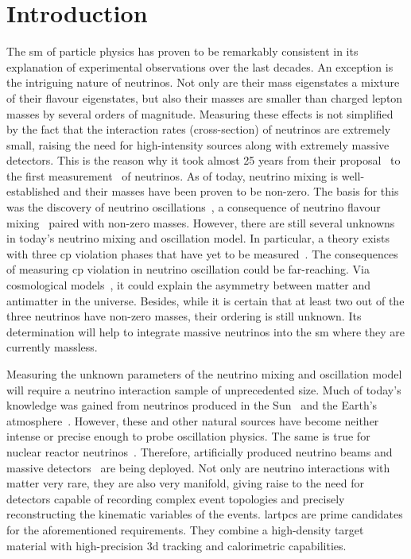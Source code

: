 \chapter{Introduction}
\label{chap:introduction}

The \gls{sm} of particle physics has proven to be remarkably consistent in its explanation of experimental observations over the last decades.
An exception is the intriguing nature of neutrinos.
Not only are their mass eigenstates a mixture of their flavour eigenstates, but also their masses are smaller than charged lepton masses by several orders of magnitude.
Measuring these effects is not simplified by the fact that the interaction rates (cross-section) of neutrinos are extremely small, raising the need for high-intensity sources along with extremely massive detectors.
This is the reason why it took almost \num{25} years from their proposal~\cite{pauliLetter} to the first measurement~\cite{reinesCowan} of neutrinos.
As of today, neutrino mixing is well-established and their masses have been proven to be non-zero.
The basis for this was the discovery of neutrino oscillations~\cite{superKAtmos1, superKAtmos2, snoSolar}, a consequence of neutrino flavour mixing~\cite{pontecorvo, makiNakagawaSakata} paired with non-zero masses.
However, there are still several unknowns in today's neutrino mixing and oscillation model.
In particular, a theory exists with three \gls{cp} violation phases that have yet to be measured~\cite{pontecorvo, makiNakagawaSakata, mariuana}.
The consequences of measuring \gls{cp} violation in neutrino oscillation could be far-reaching.
Via cosmological models~\cite{pdg}, it could explain the asymmetry between matter and antimatter in the universe.
Besides, while it is certain that at least two out of the three neutrinos have non-zero masses, their ordering is still unknown.
Its determination will help to integrate massive neutrinos into the \gls{sm} where they are currently massless.

Measuring the unknown parameters of the neutrino mixing and oscillation model will require a neutrino interaction sample of unprecedented size.
Much of today's knowledge was gained from neutrinos produced in the Sun~\cite{homestake68, homestake98, snoSolar} and the Earth's atmosphere~\cite{superKAtmos1, superKAtmos2}.
However, these and other natural sources have become neither intense or precise enough to probe oscillation physics.
The same is true for nuclear reactor neutrinos~\cite{reinesCowan, dayabayRecent}.
Therefore, artificially produced neutrino beams and massive detectors~\cite{t2kOsc} are being deployed.
Not only are neutrino interactions with matter very rare, they are also very manifold, giving raise to the need for detectors capable of recording complex event topologies and precisely reconstructing the kinematic variables of the events.
\glspl{lartpc} are prime candidates for the aforementioned requirements.
They combine a high-density target material with high-precision \gls{3d} tracking and calorimetric capabilities.

